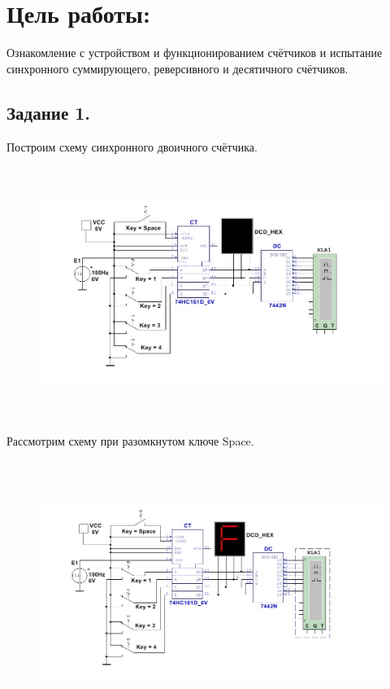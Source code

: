 \documentclass[spec, och, labwork]{shiza}
\begin{document}

\section*{Цель работы:}

Ознакомление с устройством и функционированием счётчиков и испытание синхронного
суммирующего, реверсивного и десятичного счётчиков.

\subsection*{Задание 1.}

Построим схему синхронного двоичного счётчика.

\begin{figure}[H]
    \centering
    \includegraphics[width=5.28607in,height=3.2197in]{image1.jpeg}
\end{figure}

Рассмотрим схему при разомкнутом ключе Space.

\begin{figure}[H]
    \centering
    \includegraphics[width=5.6577in,height=3.37083in]{image2.jpeg}
\end{figure}
\end{document}
